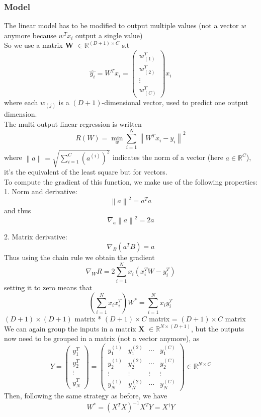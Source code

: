 \subsubsection{Model}
The linear model has to be modified to output multiple values (not a vector $w$ anymore because $w^Tx_i$ output a single value) \\
So we use a matrix \textbf{W} $\in \mathbb{R}^{(D+1)\times C}$ s.t 
\[
  \hat{y_i} = W^Tx_i = \begin{pmatrix} w_{(1)}^T \\ w_{(2)}^T \\ \vdots \\ w_{(C)}^T \end{pmatrix}x_i
\]
where each $w_{(j)}$ is a $(D+1)$-dimensional vector, used to predict one output dimension. \\
The multi-output linear regression is written
\[
  R(W) = \min_w \sum_{i=1}^{N}\left\|W^Tx_i - y_i\right\|^2
\]
where $\left\|a\right\| = \sqrt{\sum_{i=1}^{C}(a^{(i)})^2}$ indicates the norm of a vector (here $a \in \mathbb{R}^C$), it's the equivalent of the least square but for vectors.\\

To compute the gradient of this function, we make use of the following properties: \\
1. Norm and derivative:
\[
  \left\|a\right\|^2 = a^Ta
\]
and thus
\[
  \nabla_a \left\|a\right\|^2 = 2a
\]

2. Matrix derivative:
\[
  \nabla_B(a^TB) = a 
\]
Thus using the chain rule we obtain the gradient
\[
  \nabla_WR = 2 \sum_{i=1}^{N}x_i(x_i^TW - y_i^T) 
\]
setting it to zero means that
\[
  (\sum_{i=1}^{N}x_ix_i^T)W^* = \sum_{i=1}^{N}x_i y_i^T  
\]
$(D+1) \times (D+1)$ matrix * $(D+1) \times C$ matrix = $(D+1)\times C$ matrix \\
We can again group the inputs in a matrix \textbf{X} $\in \mathbb{R}^{N \times (D+1)}$, but the outputs now need to be grouped in a matrix (not a vector anymore), as 
\[
  Y = \begin{pmatrix} y_1^T \\ y_2^T \\ \vdots \\ y_N^T \end{pmatrix} = \begin{pmatrix} y_1^{(1)} &  y_1^{(2)} & \cdots & y_1^{(C)} \\ y_2^{(1)} &  y_2^{(2)} & \cdots & y_2^{(C)} \\ \vdots & \vdots & \vdots & \vdots \\ y_N^{(1)} &  y_N^{(2)} & \cdots & y_N^{(C)} \end{pmatrix} \in \mathbb{R}^{N \times C}
\]
Then, following the same strategy as before, we have
\[
W^* = (X^T X)^{-1}X^T Y = X^\dagger Y
\]
\newpage
